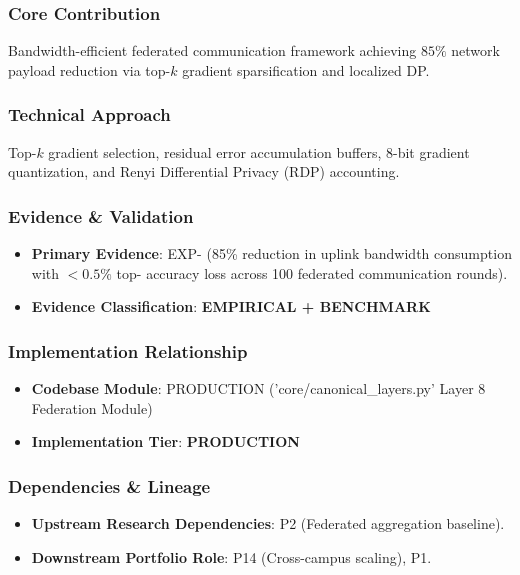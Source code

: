 \documentclass[11pt,letterpaper]{article}
\begin{document}
\subsubsection{Core Contribution}
Bandwidth-\allowbreak efficient federated communication framework achieving $85\%$ network payload reduction via top-\allowbreak $k$ gradient sparsification and localized DP.

\subsubsection{Technical Approach}
Top-\allowbreak $k$ gradient selection, residual error accumulation buffers, 8-\allowbreak bit gradient quantization, and Renyi Differential Privacy (RDP) accounting.

\subsubsection{Evidence \& Validation}
\begin{itemize}[leftmargin=*]
    \item \textbf{Primary Evidence}: EXP- (85\% reduction in uplink bandwidth consumption with $<0.5\%$ top- accuracy loss across 100 federated communication rounds).
    \item \textbf{Evidence Classification}: \textbf{EMPIRICAL + BENCHMARK}
\end{itemize}

\subsubsection{Implementation Relationship}
\begin{itemize}[leftmargin=*]
    \item \raggedright \textbf{Codebase Module}: PRODUCTION ('core/\allowbreak canonical\_\allowbreak layers.py' Layer 8 Federation Module)
    \item \textbf{Implementation Tier}: \textbf{PRODUCTION}
\end{itemize}

\subsubsection{Dependencies \& Lineage}
\begin{itemize}[leftmargin=*]
    \item \textbf{Upstream Research Dependencies}: P2 (Federated aggregation baseline).
    \item \textbf{Downstream Portfolio Role}: P14 (Cross-\allowbreak campus scaling), P1.
\end{itemize}
\end{document}
